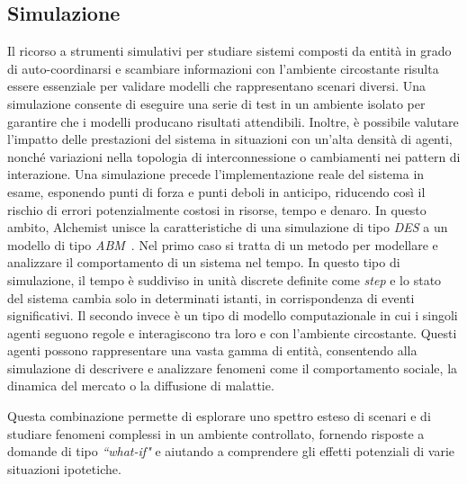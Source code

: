 \subsection{Simulazione}

Il ricorso a strumenti simulativi per studiare sistemi composti da entità in grado di auto-coordinarsi e scambiare informazioni con l'ambiente circostante risulta essere essenziale per validare modelli che rappresentano scenari diversi. Una simulazione consente di eseguire una serie di test in un ambiente isolato per garantire che i modelli producano risultati attendibili. Inoltre, è possibile valutare l'impatto delle prestazioni del sistema in situazioni con un'alta densità di agenti, nonché variazioni nella topologia di interconnessione o cambiamenti nei pattern di interazione. Una simulazione precede l'implementazione reale del sistema in esame, esponendo punti di forza e punti deboli in anticipo, riducendo così il rischio di errori potenzialmente costosi in risorse, tempo e denaro.
In questo ambito, Alchemist unisce la caratteristiche di una simulazione di tipo \textit{\ac{DES}} a un modello di tipo \textit{\ac{ABM}}~\cite{PMV2011}. Nel primo caso si tratta di un metodo per modellare e analizzare il comportamento di un sistema nel tempo. In questo tipo di simulazione, il tempo è suddiviso in unità discrete definite come \textit{step} e lo stato del sistema cambia solo in determinati istanti, in corrispondenza di eventi significativi.
Il secondo invece è un tipo di modello computazionale in cui i singoli agenti seguono regole e interagiscono tra loro e con l'ambiente circostante. Questi agenti possono rappresentare una vasta gamma di entità, consentendo alla simulazione di descrivere e analizzare fenomeni come il comportamento sociale, la dinamica del mercato o la diffusione di malattie. 

Questa combinazione permette di esplorare uno spettro esteso di scenari e di studiare fenomeni complessi in un ambiente controllato, fornendo risposte a domande di tipo \textit{``what-if"} e aiutando a comprendere gli effetti potenziali di varie situazioni ipotetiche.
